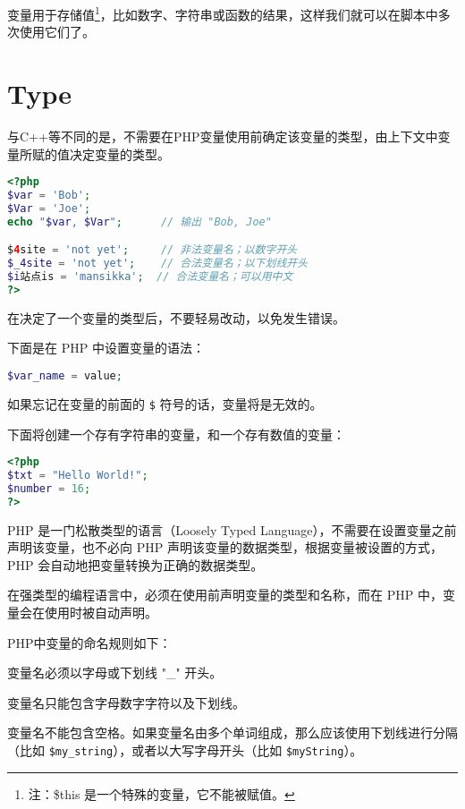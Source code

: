 变量用于存储值\footnote{注：\$this 是一个特殊的变量，它不能被赋值。}，比如数字、字符串或函数的结果，这样我们就可以在脚本中多次使用它们了。

\section{Type}


与C++等不同的是，不需要在PHP变量使用前确定该变量的类型，由上下文中变量所赋的值决定变量的类型。

\begin{lstlisting}[language=PHP]
<?php
$var = 'Bob';
$Var = 'Joe';
echo "$var, $Var";      // 输出 "Bob, Joe"

$4site = 'not yet';     // 非法变量名；以数字开头
$_4site = 'not yet';    // 合法变量名；以下划线开头
$i站点is = 'mansikka';  // 合法变量名；可以用中文
?>
\end{lstlisting}


在决定了一个变量的类型后，不要轻易改动，以免发生错误。

下面是在 PHP 中设置变量的语法：

\begin{lstlisting}[language=PHP]
$var_name = value;
\end{lstlisting}



如果忘记在变量的前面的 \texttt{\$} 符号的话，变量将是无效的。

下面将创建一个存有字符串的变量，和一个存有数值的变量：


\begin{lstlisting}[language=PHP]
<?php
$txt = "Hello World!";
$number = 16;
?>
\end{lstlisting}


PHP 是一门松散类型的语言（Loosely Typed Language），不需要在设置变量之前声明该变量，也不必向 PHP 声明该变量的数据类型，根据变量被设置的方式，PHP 会自动地把变量转换为正确的数据类型。

在强类型的编程语言中，必须在使用前声明变量的类型和名称，而在 PHP 中，变量会在使用时被自动声明。

PHP中变量的命名规则如下：

\begin{compactitem}
\item 变量名必须以字母或下划线 "\_" 开头。
\item 变量名只能包含字母数字字符以及下划线。
\item 变量名不能包含空格。如果变量名由多个单词组成，那么应该使用下划线进行分隔（比如 \texttt{\$my\_string}），或者以大写字母开头（比如 \texttt{\$myString}）。
\end{compactitem}

